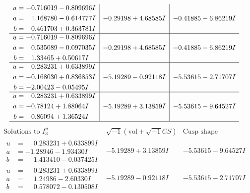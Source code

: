 \documentclass[1p]{elsarticle_modified}
\theoremstyle{definition}
\newcommand{\I}{\sqrt{-1}}
\begin{document}
$$\begin{array}{c|c|c}
\begin{aligned}
u &= -0.716019 - 0.809696 I \\
a &= \phantom{-}1.168780 - 0.614777 I \\
b &= \phantom{-}0.461703 + 0.363781 I\end{aligned}
 & -0.29198 + 4.68585 I & -0.41885 - 6.86219 I \\ \hline\begin{aligned}
u &= -0.716019 - 0.809696 I \\
a &= \phantom{-}0.535089 - 0.097035 I \\
b &= \phantom{-}1.33465 + 0.50617 I\end{aligned}
 & -0.29198 + 4.68585 I & -0.41885 - 6.86219 I \\ \hline\begin{aligned}
u &= \phantom{-}0.283231 + 0.633899 I \\
a &= -0.168030 + 0.836853 I \\
b &= -2.00423 - 0.05495 I\end{aligned}
 & -5.19289 - 0.92118 I & -5.53615 - 2.71707 I \\ \hline\begin{aligned}
u &= \phantom{-}0.283231 + 0.633899 I \\
a &= -0.78124 + 1.88064 I \\
b &= -0.86094 + 1.36524 I\end{aligned}
 & -5.19289 + 3.13859 I & -5.53615 - 9.64527 I\\
 \hline 
 \end{array}$$\newpage$$\begin{array}{c|c|c}  
\text{Solutions to }I^u_{3}& \I (\text{vol} + \sqrt{-1}CS) & \text{Cusp shape}\\
 \hline 
\begin{aligned}
u &= \phantom{-}0.283231 + 0.633899 I \\
a &= -1.28946 - 1.93430 I \\
b &= \phantom{-}1.413410 - 0.037425 I\end{aligned}
 & -5.19289 + 3.13859 I & -5.53615 - 9.64527 I \\ \hline\begin{aligned}
u &= \phantom{-}0.283231 + 0.633899 I \\
a &= \phantom{-}1.24986 - 2.60330 I \\
b &= \phantom{-}0.578072 - 0.130508 I\end{aligned}
 & -5.19289 - 0.92118 I & -5.53615 - 2.71707 I \\ \hline\begin{aligned}

\end{aligned}
\end{array}$$
\end{document}
